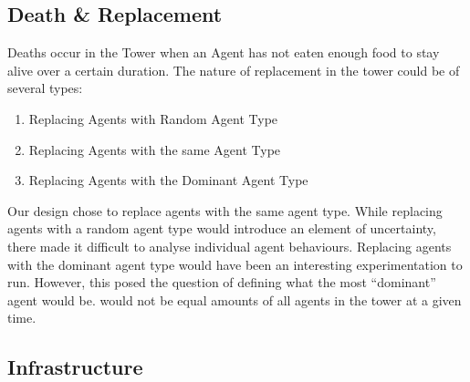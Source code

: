 \subsection{Death \& Replacement}

Deaths occur in the Tower when an Agent has not eaten enough food to stay alive over a certain duration. The nature of replacement in the tower could be of several types:

\begin{enumerate}
    \item Replacing Agents with Random Agent Type
    \item Replacing Agents with the same Agent Type
    \item Replacing Agents with the Dominant Agent Type
\end{enumerate}

Our design chose to replace agents with the same agent type. While replacing agents with a random agent type would introduce an element of uncertainty, there made it difficult to analyse individual agent behaviours. Replacing agents with the dominant agent type would have been an interesting experimentation to run. However, this posed the question of defining what the most “dominant” agent would be. would not be equal amounts of all agents in the tower at a given time.

\subsection{Infrastructure}

